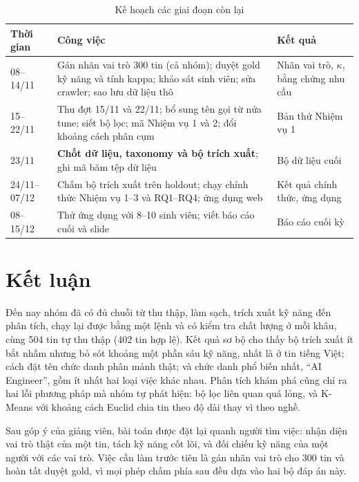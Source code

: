 \documentclass[12pt]{article}
\begin{document}
\begin{table}[htbp]
\centering
\caption{Kế hoạch các giai đoạn còn lại}
\label{tab:plan}
\renewcommand{\arraystretch}{1.15}
\begin{tabularx}{\textwidth}{l X >{\raggedright\arraybackslash}p{3.6cm}}
\toprule
\textbf{Thời gian} & \textbf{Công việc} & \textbf{Kết quả} \\
\midrule
08--14/11 & Gán nhãn vai trò 300 tin (cả nhóm); duyệt gold kỹ năng và tính kappa; khảo sát sinh viên; sửa crawler; sao lưu dữ liệu thô & Nhãn vai trò, $\kappa$, bằng chứng nhu cầu \\
15--22/11 & Thu đợt 15/11 và 22/11; bổ sung tên gọi từ nửa tune; siết bộ lọc; mã Nhiệm vụ 1 và 2; đổi khoảng cách phân cụm & Bản thử Nhiệm vụ 1 \\
23/11 & \textbf{Chốt dữ liệu, taxonomy và bộ trích xuất}; ghi mã băm tệp dữ liệu & Bộ dữ liệu cuối \\
24/11--07/12 & Chấm bộ trích xuất trên holdout; chạy chính thức Nhiệm vụ 1--3 và RQ1--RQ4; ứng dụng web & Kết quả chính thức, ứng dụng \\
08--15/12 & Thử ứng dụng với 8--10 sinh viên; viết báo cáo cuối và slide & Báo cáo cuối kỳ \\
\bottomrule
\end{tabularx}
\end{table}

\section{Kết luận}
Đến nay nhóm đã có đủ chuỗi từ thu thập, làm sạch, trích xuất kỹ năng đến phân tích, chạy lại được bằng một lệnh và có kiểm tra chất lượng ở mỗi khâu, cùng 504 tin tự thu thập (402 tin hợp lệ). Kết quả sơ bộ cho thấy bộ trích xuất ít bắt nhầm nhưng bỏ sót khoảng một phần sáu kỹ năng, nhất là ở tin tiếng Việt; cách đặt tên chức danh phân mảnh thật; và chức danh phổ biến nhất, ``AI Engineer'', gồm ít nhất hai loại việc khác nhau. Phân tích khám phá cũng chỉ ra hai lỗi phương pháp mà nhóm tự phát hiện: bộ lọc liên quan quá lỏng, và K-Means với khoảng cách Euclid chia tin theo độ dài thay vì theo nghề.

Sau góp ý của giảng viên, bài toán được đặt lại quanh người tìm việc: nhận diện vai trò thật của một tin, tách kỹ năng cốt lõi, và đối chiếu kỹ năng của một người với các vai trò. Việc cần làm trước tiên là gán nhãn vai trò cho 300 tin và hoàn tất duyệt gold, vì mọi phép chấm phía sau đều dựa vào hai bộ đáp án này.
\end{document}
